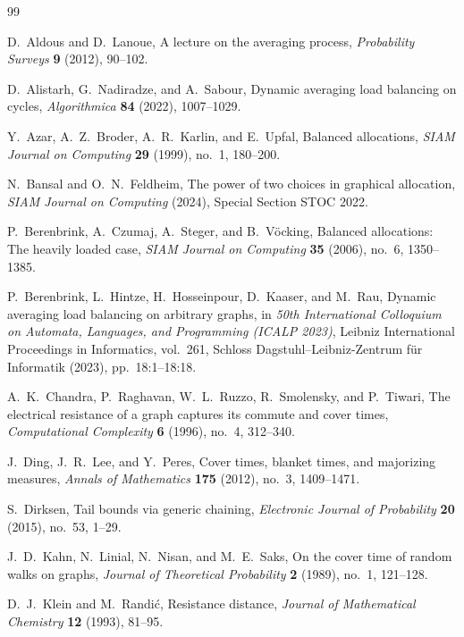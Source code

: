 \documentclass[11pt]{article}
\numberwithin{equation}{section}
\newcommand{\1}{\mathbf{1}}
\begin{document}
\begin{thebibliography}{99}

D.~Aldous and D.~Lanoue,
A lecture on the averaging process,
\emph{Probability Surveys}
\textbf{9} (2012), 90--102.

D.~Alistarh, G.~Nadiradze, and A.~Sabour,
Dynamic averaging load balancing on cycles,
\emph{Algorithmica}
\textbf{84} (2022), 1007--1029.

Y.~Azar, A.~Z.~Broder, A.~R.~Karlin, and E.~Upfal,
Balanced allocations,
\emph{SIAM Journal on Computing}
\textbf{29} (1999), no.~1, 180--200.

N.~Bansal and O.~N.~Feldheim,
The power of two choices in graphical allocation,
\emph{SIAM Journal on Computing} (2024),
Special Section STOC 2022.

P.~Berenbrink, A.~Czumaj, A.~Steger, and B.~V\"ocking,
Balanced allocations: The heavily loaded case,
\emph{SIAM Journal on Computing}
\textbf{35} (2006), no.~6, 1350--1385.

P.~Berenbrink, L.~Hintze, H.~Hosseinpour, D.~Kaaser, and M.~Rau,
Dynamic averaging load balancing on arbitrary graphs,
in \emph{50th International Colloquium on Automata, Languages, and Programming (ICALP 2023)},
Leibniz International Proceedings in Informatics,
vol.~261, Schloss Dagstuhl--Leibniz-Zentrum f\"ur Informatik
(2023), pp.~18:1--18:18.

A.~K.~Chandra, P.~Raghavan, W.~L.~Ruzzo, R.~Smolensky, and P.~Tiwari,
The electrical resistance of a graph captures its commute and cover times,
\emph{Computational Complexity}
\textbf{6} (1996), no.~4, 312--340.

J.~Ding, J.~R.~Lee, and Y.~Peres,
Cover times, blanket times, and majorizing measures,
\emph{Annals of Mathematics}
\textbf{175} (2012), no.~3, 1409--1471.

S.~Dirksen,
Tail bounds via generic chaining,
\emph{Electronic Journal of Probability}
\textbf{20} (2015), no.~53, 1--29.

J.~D.~Kahn, N.~Linial, N.~Nisan, and M.~E.~Saks,
On the cover time of random walks on graphs,
\emph{Journal of Theoretical Probability}
\textbf{2} (1989), no.~1, 121--128.

D.~J.~Klein and M.~Randi\'c,
Resistance distance,
\emph{Journal of Mathematical Chemistry}
\textbf{12} (1993), 81--95.


\end{thebibliography}
\end{document}
